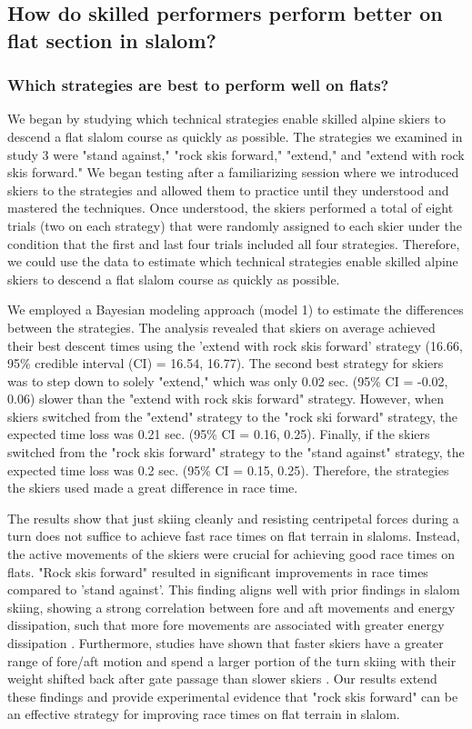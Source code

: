 
\subsection{How do skilled performers perform better on flat section in slalom?}


\subsubsection{Which strategies are best to perform well on flats?}
We began by studying which technical strategies enable skilled alpine skiers to descend a flat slalom course as quickly as possible. The strategies we examined in study 3 were "stand against," "rock skis forward," "extend," and "extend with rock skis forward." We began testing after a familiarizing session where we introduced skiers to the strategies and allowed them to practice until they understood and mastered the techniques. Once understood, the skiers performed a total of eight trials (two on each strategy) that were randomly assigned to each skier under the condition that the first and last four trials included all four strategies. Therefore, we could use the data to estimate which technical strategies enable skilled alpine skiers to descend a flat slalom course as quickly as possible.

We employed a Bayesian modeling approach (model 1) to estimate the differences between the strategies. The analysis revealed that skiers on average achieved their best descent times using the 'extend with rock skis forward' strategy (16.66, 95\% credible interval (CI) = 16.54, 16.77). The second best strategy for skiers was to step down to solely "extend," which was only 0.02 sec. (95\% CI = -0.02, 0.06) slower than the "extend with rock skis forward" strategy. However, when skiers switched from the "extend" strategy to the "rock ski forward" strategy, the expected time loss was 0.21 sec. (95\% CI = 0.16, 0.25). Finally, if the skiers switched from the "rock skis forward" strategy to the "stand against" strategy, the expected time loss was 0.2 sec. (95\% CI = 0.15, 0.25). Therefore, the strategies the skiers used made a great difference in race time.

The results show that just skiing cleanly and resisting centripetal forces during a turn does not suffice to achieve fast race times on flat terrain in slaloms. Instead, the active movements of the skiers were crucial for achieving good race times on flats. "Rock skis forward" resulted in significant improvements in race times compared to 'stand against'. This finding aligns well with prior findings in slalom skiing, showing a strong correlation between fore and aft movements and energy dissipation, such that more fore movements are associated with greater energy dissipation \cite{reid_turn_2009, reid_kinematic_2010}. Furthermore, studies have shown that faster skiers have a greater range of fore/aft motion and spend a larger portion of the turn skiing with their weight shifted back after gate passage than slower skiers \cite{tjorhom_beskrivelse_2007, reid_kinematic_2010}. Our results extend these findings and provide experimental evidence that "rock skis forward" can be an effective strategy for improving race times on flat terrain in slalom.

